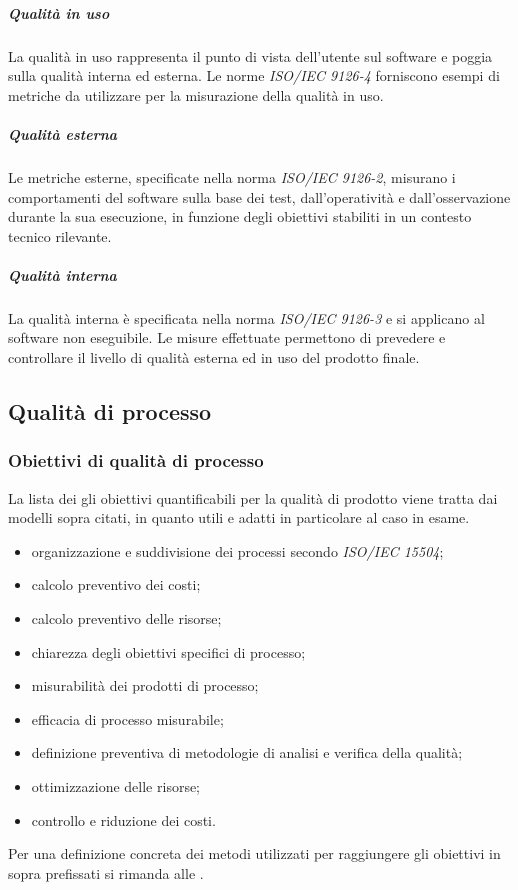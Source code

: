 \documentclass[12pt,a4paper]{article}
\begin{document}
\subparagraph{Qualità in uso}
La qualità in uso rappresenta il punto di vista dell'utente sul software e poggia sulla qualità interna ed esterna. Le norme \textit{ISO/IEC 9126-4} forniscono esempi di metriche da utilizzare per la misurazione della qualità in uso.

\subparagraph{Qualità esterna}
Le metriche esterne, specificate nella norma \textit{ISO/IEC 9126-2}, misurano i comportamenti del software sulla base dei test, dall'operatività e dall'osservazione durante la sua esecuzione, in funzione degli obiettivi stabiliti in un contesto tecnico rilevante.

\subparagraph{Qualità interna}
La qualità interna è specificata nella norma \textit{ISO/IEC 9126-3} e si applicano al software non eseguibile. Le misure effettuate permettono di prevedere e controllare il livello di qualità esterna ed in uso del prodotto finale.

\subsection{Qualità di processo}

\subsubsection{Obiettivi di qualità di processo}
La lista dei gli obiettivi quantificabili per la qualità di prodotto viene tratta dai modelli sopra citati, in quanto utili e adatti in particolare al caso in esame.
\begin{itemize}
	\item organizzazione e suddivisione dei processi secondo \textit{ISO/IEC 15504};
	\item calcolo preventivo dei costi;
	\item calcolo preventivo delle risorse;
	\item chiarezza degli obiettivi specifici di processo;
	\item misurabilità dei prodotti di processo;
	\item efficacia di processo misurabile;
	\item definizione preventiva di metodologie di analisi e verifica della qualità;
	\item ottimizzazione delle risorse;
	\item controllo e riduzione dei costi.
\end{itemize}
Per una definizione concreta dei metodi utilizzati per raggiungere gli obiettivi in sopra prefissati si rimanda alle \NdP{}.
\end{document}
